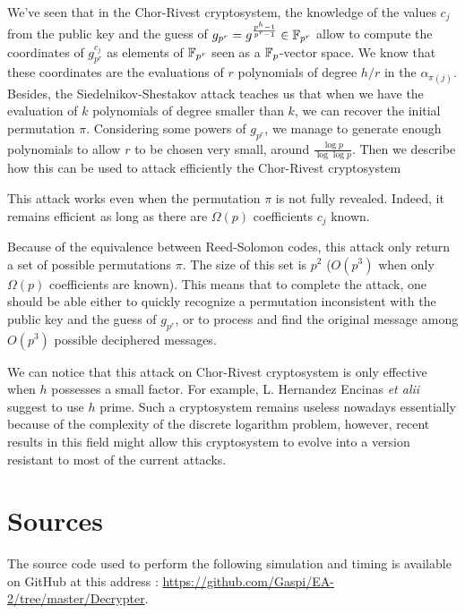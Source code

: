 \documentclass[a4paper]{article}
\begin{document}
We've seen that in the Chor-Rivest cryptosystem, the knowledge of the values $c_j$ from the public key and the guess of $g_{p^r} = g^{\frac{p^h-1}{p^r-1}} \in \mathbb{F}_{p^r}$ allow to compute the coordinates of $g_{p^r}^{c_j}$ as elements of $\mathbb{F}_{p^r}$ seen as a $\mathbb{F}_p$-vector space. We know that these coordinates are the evaluations of $r$ polynomials of degree $h/r$ in the $\alpha_{\pi(j)}$. Besides, the Siedelnikov-Shestakov attack teaches us that when we have the evaluation of $k$ polynomials of degree smaller than $k$, we can recover the initial permutation $\pi$. Considering some powers of $g_{p^r}$, we manage to generate enough polynomials to allow $r$ to be chosen very small, around $\frac{\log p}{\log \log p}$. Then we describe how this can be used to attack efficiently the Chor-Rivest cryptosystem

This attack works even when the permutation $\pi$ is not fully revealed. Indeed, it remains efficient as long as there are $\Omega(p)$ coefficients $c_j$ known.

Because of the equivalence between Reed-Solomon codes, this attack only return a set of possible permutations $\pi$. The size of this set is $p^2$ ($O(p^3)$ when only $\Omega(p)$ coefficients are known). This means that to complete the attack, one should be able either to quickly recognize a permutation inconsistent with the public key and the guess of $g_{p^r}$, or to process and find the original message among $O(p^3)$ possible deciphered messages.

We can notice that this attack on Chor-Rivest cryptosystem is only effective when $h$ possesses a small factor. For example, L. Hernandez Encinas \textit{et alii} \cite{Enc04} suggest to use $h$ prime. Such a cryptosystem remains useless nowadays essentially because of the complexity of the discrete logarithm problem, however, recent results in this field might allow this cryptosystem to evolve into a version resistant to most of the current attacks.







\newpage
\appendix
\section{Sources}

The source code used to perform the following simulation and timing is available on GitHub at this address : \url{https://github.com/Gaspi/EA-2/tree/master/Decrypter}.
\end{document}
